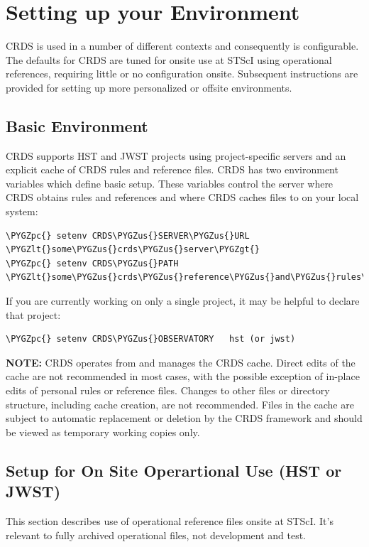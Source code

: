 \documentclass[letterpaper,10pt,english]{sphinxmanual}
\def\PYGZus{\char`\_}
\def\PYGZlt{\char`\<}
\def\PYGZgt{\char`\>}
\def\PYGZpc{\char`\%}
\begin{document}
\chapter{Setting up your Environment}
\label{installation:setting-up-your-environment}
CRDS is used in a number of different contexts and consequently is configurable.   The defaults for
CRDS are tuned for onsite use at STScI using operational references,  requiring little or no configuration onsite.
Subsequent instructions are provided for setting up more personalized or offsite environments.


\section{Basic Environment}
\label{installation:basic-environment}
CRDS supports HST and JWST projects using project-specific servers and an explicit cache of CRDS rules and reference
files.   CRDS has two environment variables which define basic setup.   These variables control the server where CRDS
obtains rules and references and where CRDS caches files to on your local system:

\begin{Verbatim}[commandchars=\\\{\}]
\PYGZpc{} setenv CRDS\PYGZus{}SERVER\PYGZus{}URL  \PYGZlt{}some\PYGZus{}crds\PYGZus{}server\PYGZgt{}
\PYGZpc{} setenv CRDS\PYGZus{}PATH        \PYGZlt{}some\PYGZus{}crds\PYGZus{}reference\PYGZus{}and\PYGZus{}rules\PYGZus{}cache\PYGZus{}directory\PYGZgt{}
\end{Verbatim}

If you are currently working on only a single project,  it may be helpful to declare that project:

\begin{Verbatim}[commandchars=\\\{\}]
\PYGZpc{} setenv CRDS\PYGZus{}OBSERVATORY   hst (or jwst)
\end{Verbatim}

\textbf{NOTE:}  CRDS operates from and manages the CRDS cache.   Direct edits of the cache are not recommended in
most cases,  with the possible exception of in-place edits of personal rules or reference files.   Changes to
other files or directory structure,   including cache creation,  are not recommended.   Files in the cache
are subject to automatic replacement or deletion by the CRDS framework and should be viewed as temporary
working copies only.


\section{Setup for On Site Operartional Use (HST or JWST)}
\label{installation:setup-for-on-site-operartional-use-hst-or-jwst}
This section describes use of operational reference files onsite at STScI.  It's relevant to fully archived
operational files,  not development and test.
\end{document}
